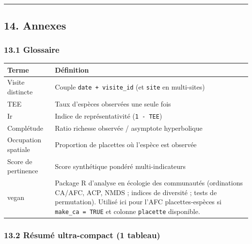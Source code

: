 \begin{center}\rule{0.5\linewidth}{0.5pt}\end{center}

\subsection{14. Annexes}\label{annexes}

\subsubsection{13.1 Glossaire}\label{glossaire}

{\def\LTcaptype{none} %
\begin{longtable}[]{@{}
  >{\raggedright\arraybackslash}p{}
  >{\raggedright\arraybackslash}p{}@{}}
\toprule\noalign{}
\begin{minipage}[b]{\linewidth}\raggedright
Terme
\end{minipage} & \begin{minipage}[b]{\linewidth}\raggedright
Définition
\end{minipage} \\
\midrule\noalign{}
\endhead
\bottomrule\noalign{}
\endlastfoot
Visite distincte & Couple \texttt{date\ +\ visite\_id} (et \texttt{site}
en multi-sites) \\
TEE & Taux d'espèces observées une seule fois \\
Ir & Indice de représentativité (\texttt{1\ -\ TEE}) \\
Complétude & Ratio richesse observée / asymptote hyperbolique \\
Occupation spatiale & Proportion de placettes où l'espèce est
observée \\
Score de pertinence & Score synthétique pondéré multi-indicateurs \\
vegan & Package R d'analyse en écologie des communautés (ordinations
CA/AFC, ACP, NMDS ; indices de diversité ; tests de permutation).
Utilisé ici pour l'AFC placettes-espèces si \texttt{make\_ca\ =\ TRUE}
et colonne \texttt{placette} disponible. \\
\end{longtable}
}

\subsubsection{13.2 Résumé ultra-compact (1
tableau)}\label{ruxe9sumuxe9-ultra-compact-1-tableau}

